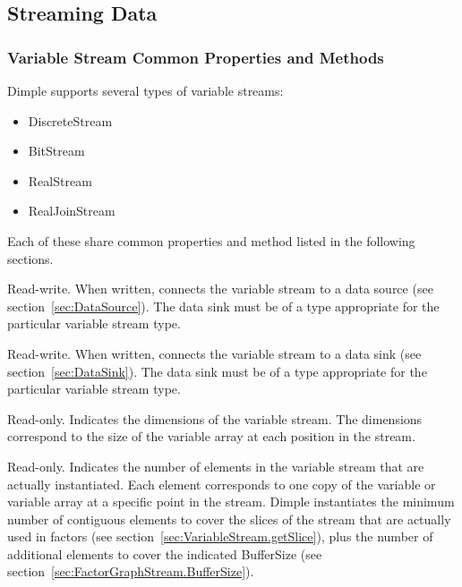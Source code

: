 \subsection{Streaming Data}

\subsubsection{Variable Stream Common Properties and Methods}

Dimple supports several types of variable streams:

\begin{itemize}
\item DiscreteStream
\item BitStream
\item RealStream
\item RealJoinStream
\end{itemize}

Each of these share common properties and method listed in the following sections.



Read-write.  When written, connects the variable stream to a data source (see section~\ref{sec:DataSource}).  The data sink must be of a type appropriate for the particular variable stream type.


Read-write.  When written, connects the variable stream to a data sink (see section~\ref{sec:DataSink}).  The data sink must be of a type appropriate for the particular variable stream type.


Read-only.  Indicates the dimensions of the variable stream.  The dimensions correspond to the size of the variable array at each position in the stream.


Read-only.  Indicates the number of elements in the variable stream that are actually instantiated.  Each element corresponds to one copy of the variable or variable array at a specific point in the stream.  Dimple instantiates the minimum number of contiguous elements to cover the slices of the stream that are actually used in factors (see section~\ref{sec:VariableStream.getSlice}), plus the number of additional elements to cover the indicated BufferSize (see section~\ref{sec:FactorGraphStream.BufferSize}).

